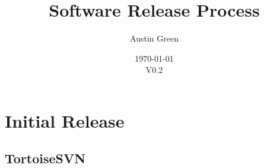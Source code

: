 \documentclass[10pt]{article}
\title{Software Release Process}
\author{Austin Green}
\date{\today\\V0.2}
\begin{document}
    \begin{titlepage}
    \maketitle
    \thispagestyle{empty}
    \end{titlepage}

	\tableofcontents
	\newpage

    \section{Initial Release}
        \subsection{TortoiseSVN}
\end{document}
